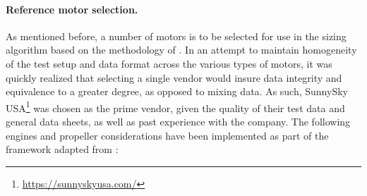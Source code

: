 \paragraph{Reference motor selection.} As mentioned before, a number of motors is to be selected for use in the sizing algorithm based on the methodology of \citet{Winslow2018}. In an attempt to maintain homogeneity of the test setup and data format across the various types of motors, it was quickly realized that selecting a single vendor would insure data integrity and equivalence to a greater degree, as opposed to mixing data. As such, SunnySky USA\footnote{\url{https://sunnyskyusa.com/}} was chosen as the prime vendor, given the quality of their test data and general data sheets, as well as past experience with the company. The following engines and propeller considerations have been implemented as part of the framework adapted from \citet{Winslow2018}:

